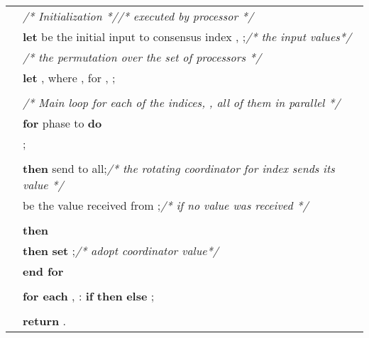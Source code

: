 \documentclass[11pt]{article}
\newcommand{\tb}{\makebox[0.6cm]{}}
\newcommand{\Byzantine}[0]{\mbox{\emph{Byzantin}\hspace{-0.15em}\emph{e}}\xspace}
\newcommand{\ca}{{\small\textsc{commit\!\_adopt}}\xspace}
\begin{document}
\begin{algorithm}[!ht]
\footnotesize
{}
 \setcounter{AlgoLine}{0}
\begin{tabular}{ r l }
\nl & \textit{/* Initialization */}\mbox{\hspace{2.5in}}\hfill\textit{/* executed by processor */}\\
\lnl{line:input}& {\bf let}  be the initial input to consensus index , ;\hfill\textit{/* the input values*/}\\
\nl &\tb\textit{/* the permutation over the set of   processors */}\\
\lnl{line:assign} & {\bf let} , where , for , ;\\
\\
\nl & \textit{/* Main loop for each of the  indices, , all of them in parallel */}\\
\nl & {\bf for} phase  to  {\bf do}\\

\lnl{line:ca} & \tb   {\bf \ca};\\
\\
\lnl{line:sender} & \tb  {\bf if}  {\bf then}    send  to all;\hfill\textit{/* the rotating coordinator for index  sends its value */}\\
\lnl{line:vote} & \tb\tb  {\bf let}  be the value received from ;\hfill\textit{/*  if no value was received */}\\
\\
\lnl{line:update1} & \tb {\bf if}  {\bf then}  \\
\lnl{line:update2} & \tb\tb  {\bf else if}  {\bf then} {\bf set} ;\hfill\textit{/*  adopt coordinator    value*/}\\
\nl & {\bf end for}\\
\\
\lnl{line:output}& {\bf for each} , : {\bf if}  {\bf then}   {\bf else} ;\\
\\
\nl & {\bf return} .
\end{tabular}
 \caption[caption]{:  \\\hspace{\textwidth}\mbox{\ \hspace{0.75in}}a  \Byzantine -vector-set consensus algorithm}\label{figure:mSetCons}
\end{algorithm}
\end{document}
